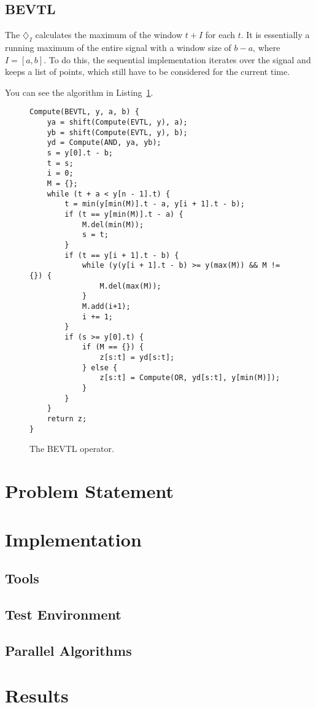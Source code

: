 \documentclass[a4paper,10pt]{article}
\newcommand{\Bevtl}{\diamondsuit_I}
\begin{document}
\subsection{BEVTL}

The $\Bevtl$ calculates the maximum of the window $t + I$ for each $t$. It is
essentially a running maximum of the entire signal with a window size of $b - a$,
where $I = [a,b]$. To do this, the sequential implementation iterates over the signal
and keeps a list of points, which still have to be considered for the current time.

You can see the algorithm in Listing~\ref{fig:bevtl}.

\begin{figure}[ht]
\begin{lstlisting}
Compute(BEVTL, y, a, b) {
    ya = shift(Compute(EVTL, y), a);
    yb = shift(Compute(EVTL, y), b);
    yd = Compute(AND, ya, yb);
    s = y[0].t - b;
    t = s;
    i = 0;
    M = {};
    while (t + a < y[n - 1].t) {
        t = min(y[min(M)].t - a, y[i + 1].t - b);
        if (t == y[min(M)].t - a) {
            M.del(min(M));
            s = t;
        }
        if (t == y[i + 1].t - b) {
            while (y(y[i + 1].t - b) >= y(max(M)) && M != {}) {
                M.del(max(M));
            }
            M.add(i+1);
            i += 1;
        }
        if (s >= y[0].t) {
            if (M == {}) {
                z[s:t] = yd[s:t];
            } else {
                z[s:t] = Compute(OR, yd[s:t], y[min(M)]);
            }
        }
    }
    return z;
}
\end{lstlisting}
\label{fig:bevtl}
\caption{The BEVTL operator.}
\end{figure}

\section{Problem Statement}

\section{Implementation}

\subsection{Tools}
\subsection{Test Environment}
\subsection{Parallel Algorithms}


\section{Results}
\end{document}
